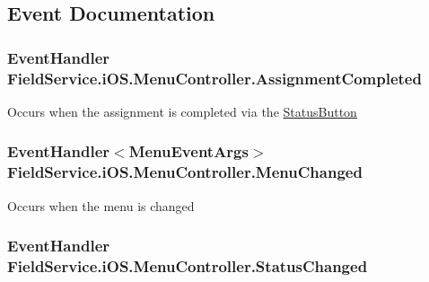 \subsection{Event Documentation}
\hypertarget{class_field_service_1_1i_o_s_1_1_menu_controller_a94847a3ca86ba4799e37d2a7ba7fe0cd}{
\subsubsection[{Assignment\+Completed}]{\setlength{\rightskip}{0pt plus 5cm}Event\+Handler Field\+Service.\+i\+O\+S.\+Menu\+Controller.\+Assignment\+Completed}}\label{class_field_service_1_1i_o_s_1_1_menu_controller_a94847a3ca86ba4799e37d2a7ba7fe0cd}


Occurs when the assignment is completed via the \hyperlink{class_field_service_1_1i_o_s_1_1_status_button}{Status\+Button} 

\hypertarget{class_field_service_1_1i_o_s_1_1_menu_controller_a9f0e68518e2f2b804f56b9b4abcf6474}{
\subsubsection[{Menu\+Changed}]{\setlength{\rightskip}{0pt plus 5cm}Event\+Handler$<${\bf Menu\+Event\+Args}$>$ Field\+Service.\+i\+O\+S.\+Menu\+Controller.\+Menu\+Changed}}\label{class_field_service_1_1i_o_s_1_1_menu_controller_a9f0e68518e2f2b804f56b9b4abcf6474}


Occurs when the menu is changed 

\hypertarget{class_field_service_1_1i_o_s_1_1_menu_controller_a7b1a40b58db1c202d3bbf84f4dbe5d67}{
\subsubsection[{Status\+Changed}]{\setlength{\rightskip}{0pt plus 5cm}Event\+Handler Field\+Service.\+i\+O\+S.\+Menu\+Controller.\+Status\+Changed}}\label{class_field_service_1_1i_o_s_1_1_menu_controller_a7b1a40b58db1c202d3bbf84f4dbe5d67}


